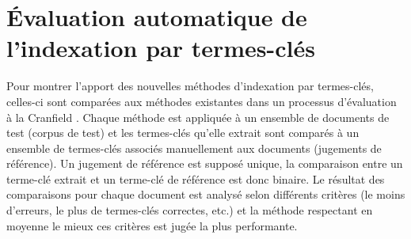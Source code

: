   \section{Évaluation automatique de l'indexation par termes-clés}
  \label{sec:main-state_of_the_art-automatic_evaluation_of_keyphrase_annotation}
    Pour montrer l'apport des nouvelles méthodes d'indexation par termes-clés,
    celles-ci sont comparées aux méthodes existantes dans un processus
    d'évaluation \og{}à la Cranfield\fg{} \citep{voorhees2002philosophy}. Chaque
    méthode est appliquée à un ensemble de documents de test (corpus de test) et
    les termes-clés qu'elle extrait sont comparés à un ensemble de termes-clés
    associés manuellement aux documents (jugements de référence). Un jugement de
    référence est supposé unique, la comparaison entre un terme-clé extrait
    et un terme-clé de référence est donc binaire. Le résultat des comparaisons
    pour chaque document est analysé selon différents critères (le moins
    d'erreurs, le plus de termes-clés correctes, etc.) et la méthode respectant
    en moyenne le mieux ces critères est jugée la plus performante.

